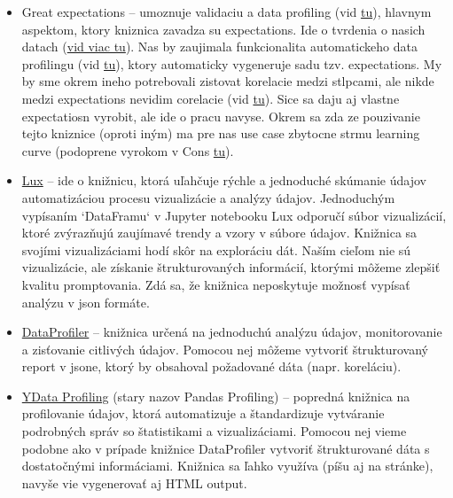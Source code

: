 \begin{itemize}
\item Great expectations -- umoznuje validaciu a data profiling (vid \href{https://legacy.017.docs.greatexpectations.io/docs/0.15.50/}{tu}), hlavnym aspektom, ktory kniznica zavadza su expectations. Ide o tvrdenia o nasich datach (\href{https://legacy.017.docs.greatexpectations.io/docs/0.15.50/#expectations}{vid viac tu}). Nas by zaujimala funkcionalita automatickeho data profilingu (vid \href{https://legacy.017.docs.greatexpectations.io/docs/0.15.50/#automated-data-profiling}{tu}), ktory automaticky vygeneruje sadu tzv. expectations. My by sme okrem ineho potrebovali zistovat korelacie medzi stlpcami, ale nikde medzi expectations nevidim corelacie (vid \href{https://legacy.017.docs.greatexpectations.io/docs/0.15.50/#automated-data-profiling}{tu}). Sice sa daju aj vlastne expectatiosn vyrobit, ale ide o pracu navyse. Okrem sa zda ze pouzivanie tejto kniznice (oproti iným) ma pre nas use case zbytocne strmu learning curve (podoprene vyrokom v Cons \href{https://paul-fry.medium.com/data-profiling-using-great-expectations-17776f140cdc#59d3}{tu}).

\item \href{https://github.com/lux-org/lux}{Lux} -- ide o knižnicu, ktorá uľahčuje rýchle a jednoduché skúmanie údajov automatizáciou procesu vizualizácie a analýzy údajov. Jednoduchým vypísaním `DataFramu` v Jupyter notebooku Lux odporučí súbor vizualizácií, ktoré zvýrazňujú zaujímavé trendy a vzory v súbore údajov. Knižnica sa svojími vizualizáciami hodí skôr na exploráciu dát. Naším cieľom nie sú vizualizácie, ale získanie štrukturovaných informácií, ktorými môžeme zlepšiť kvalitu promptovania. Zdá sa, že knižnica neposkytuje možnosť vypísať analýzu v json formáte. 

\item \href{https://github.com/capitalone/DataProfiler}{DataProfiler} -- knižnica určená na jednoduchú analýzu údajov, monitorovanie a zisťovanie citlivých údajov. Pomocou nej môžeme vytvoriť štrukturovaný report v jsone, ktorý by obsahoval požadované dáta (napr. koreláciu).

\item \href{https://docs.profiling.ydata.ai/latest/}{YData Profiling} (stary nazov Pandas Profiling) -- popredná knižnica na profilovanie údajov, ktorá automatizuje a štandardizuje vytváranie podrobných správ so štatistikami a vizualizáciami. Pomocou nej vieme podobne ako v prípade knižnice DataProfiler vytvoriť štrukturované dáta s dostatočnými informáciami. Knižnica sa ľahko využíva (píšu aj na stránke), navyše vie vygenerovať aj HTML output.
\end{itemize}

